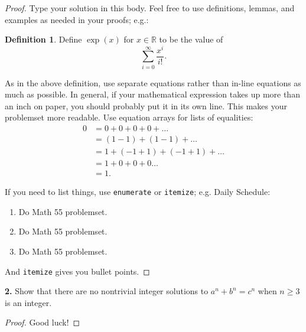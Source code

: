 \documentclass[12pt]{amsart}
\newenvironment{statement}[1]{\smallskip\noindent\color[rgb]{1.00,0.00,0.50} {\bf #1.}}{}
\theoremstyle{definition}
\newtheorem{defn}[theorem]{Definition}
\theoremstyle{remark}
\newcommand{\BR}{\mathbb R}
\begin{document}
\begin{proof}
    Type your solution in this body. Feel free to use definitions, lemmas, and examples as needed in your proofs; e.g.:
    \begin{defn}
        Define $\exp(x)$ for $x \in \BR$ to be the value of $$\sum_{i = 0}^\infty\frac{x^i}{i!}.$$
    \end{defn}
    As in the above definition, use separate equations rather than in-line equations as much as possible. In general, if your mathematical expression takes up more than an inch on paper, you should probably put it in its own line. This makes your problemset more readable. Use equation arrays for lists of equalities:
    \begin{align*}
        0 &= 0 + 0 + 0 + 0 + \dots\\
        &= (1 - 1) + (1 - 1) + \dots \\
        &= 1 + (-1 + 1) + (-1 + 1) + \dots \\
        &= 1 + 0 + 0 + 0 \dots \\
        &= 1.
    \end{align*}

    If you need to list things, use {\tt enumerate} or {\tt itemize}; e.g. Daily Schedule:
    \begin{enumerate}
        \item Do Math 55 problemset.
        \item Do Math 55 problemset.
        \item Do Math 55 problemset.
    \end{enumerate}
    And {\tt itemize} gives you bullet points.
\end{proof}

\begin{statement}{2}
    Show that there are no nontrivial integer solutions to $a^n + b^n = c^n$ when $n\ge 3$ is an integer.
\end{statement}
\begin{proof}
    Good luck!
\end{proof}
\end{document}

